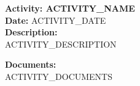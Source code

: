 \textbf{Activity: {{ ACTIVITY_NAME }}} \\
\textbf{Date:} {{ ACTIVITY_DATE }} \\
\textbf{Description:} \\
{{ ACTIVITY_DESCRIPTION }}

\vspace{0.1cm}

\textbf{Documents:} \\
{{ ACTIVITY_DOCUMENTS }}